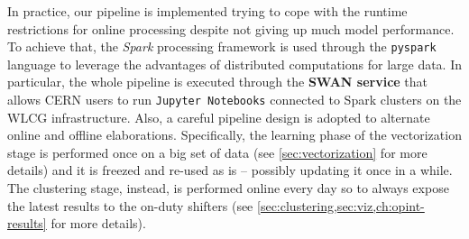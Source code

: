 In practice, our pipeline is implemented trying to cope with the runtime restrictions for online processing despite not giving up much model performance.
To achieve that, the \textit{Spark} \cite{zaharia2010spark} processing framework is used through the \texttt{pyspark} language to leverage the advantages of distributed computations for large data. 
In particular, the whole pipeline is executed through the \textbf{SWAN service} \cite{piparo2018swan} that allows CERN users to run \texttt{Jupyter Notebooks} connected to Spark clusters on the WLCG infrastructure.
Also, a careful pipeline design is adopted to alternate online and offline elaborations.
Specifically, the learning phase of the vectorization stage is performed once on a big set of data (see \cref{sec:vectorization} for more details) and it is freezed and re-used as is -- possibly updating it once in a while.
The clustering stage, instead, is performed online every day so to always expose the latest results to the on-duty shifters (see %
\cref{sec:clustering,sec:viz,ch:opint-results}
for more details).
